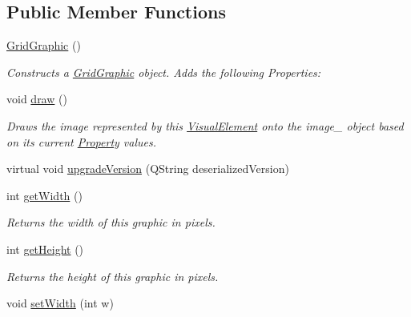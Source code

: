 \subsection*{Public Member Functions}
\begin{DoxyCompactItemize}
\item 
\hyperlink{class_picto_1_1_grid_graphic_a27af6c6c51429ea1f9ecb326fef9adb6}{Grid\-Graphic} ()
\begin{DoxyCompactList}\small\item\em Constructs a \hyperlink{class_picto_1_1_grid_graphic}{Grid\-Graphic} object.  Adds the following Properties\-: \end{DoxyCompactList}\item 
\hypertarget{class_picto_1_1_grid_graphic_ae0a8d297ab9dc8e2932d3d007be073fb}{void \hyperlink{class_picto_1_1_grid_graphic_ae0a8d297ab9dc8e2932d3d007be073fb}{draw} ()}\label{class_picto_1_1_grid_graphic_ae0a8d297ab9dc8e2932d3d007be073fb}

\begin{DoxyCompactList}\small\item\em Draws the image represented by this \hyperlink{struct_picto_1_1_visual_element}{Visual\-Element} onto the image\-\_\- object based on its current \hyperlink{class_picto_1_1_property}{Property} values. \end{DoxyCompactList}\item 
virtual void \hyperlink{class_picto_1_1_grid_graphic_a1e597bb8d934abcc95dad8e47e102b56}{upgrade\-Version} (Q\-String deserialized\-Version)
\item 
\hypertarget{class_picto_1_1_grid_graphic_a83dbe9ca9c8971a07c702f23762e25ad}{int \hyperlink{class_picto_1_1_grid_graphic_a83dbe9ca9c8971a07c702f23762e25ad}{get\-Width} ()}\label{class_picto_1_1_grid_graphic_a83dbe9ca9c8971a07c702f23762e25ad}

\begin{DoxyCompactList}\small\item\em Returns the width of this graphic in pixels. \end{DoxyCompactList}\item 
\hypertarget{class_picto_1_1_grid_graphic_aefe7a12d40f2a4a2193cde3625001d87}{int \hyperlink{class_picto_1_1_grid_graphic_aefe7a12d40f2a4a2193cde3625001d87}{get\-Height} ()}\label{class_picto_1_1_grid_graphic_aefe7a12d40f2a4a2193cde3625001d87}

\begin{DoxyCompactList}\small\item\em Returns the height of this graphic in pixels. \end{DoxyCompactList}\item 
\hypertarget{class_picto_1_1_grid_graphic_a4776fc90b2bc5d66a986ca567cede604}{void \hyperlink{class_picto_1_1_grid_graphic_a4776fc90b2bc5d66a986ca567cede604}{set\-Width} (int w)}\label{class_picto_1_1_grid_graphic_a4776fc90b2bc5d66a986ca567cede604}


\end{DoxyCompactItemize}
